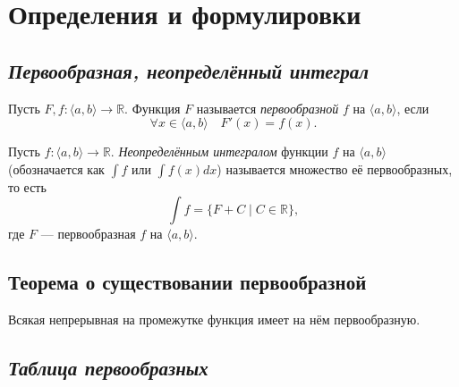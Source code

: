 \section{Определения и формулировки}

\subsection{\itshape Первообразная, неопределённый интеграл}

\begin{ndefinition}
	Пусть $F, f \colon \langle a, b \rangle \to \mathbb{R}$.
	Функция $F$ называется \textit{первообразной} $f$ на $\langle a, b \rangle$, если \[
		\forall x \in \langle a, b \rangle \quad F'(x) = f(x).
	\]
\end{ndefinition}

\begin{ndefinition}
	Пусть $f \colon \langle a, b \rangle \to \mathbb{R}$.
	\textit{Неопределённым интегралом} функции $f$ на $\langle a, b \rangle$
	(обозначается как $\int f$ или $\int f(x) dx$) называется множество её первообразных,
	то есть \[
		\int f = \{ F + C \mid C \in \mathbb{R} \},
	\]
	где $F$ --- первообразная $f$ на $\langle a, b \rangle$.
\end{ndefinition}

\subsection{Теорема о существовании первообразной}

\begin{theorem}
	Всякая непрерывная на промежутке функция имеет на нём первообразную.
\end{theorem}

\subsection{\itshape Таблица первообразных}

